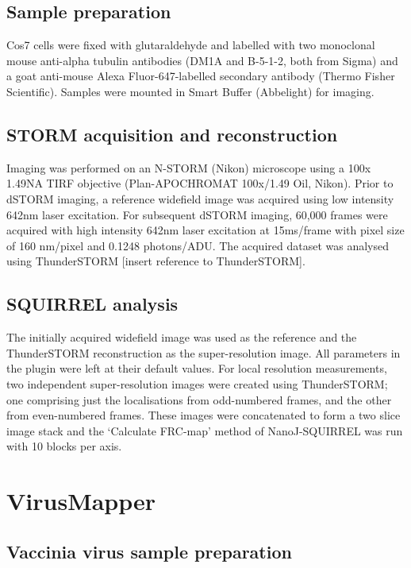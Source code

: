 \subsection{Sample preparation}

Cos7 cells were fixed with glutaraldehyde and labelled with two monoclonal mouse anti-alpha tubulin antibodies (DM1A and B-5-1-2, both from Sigma) and a goat anti-mouse Alexa Fluor-647-labelled secondary antibody (Thermo Fisher Scientific). Samples were mounted in Smart Buffer (Abbelight) for imaging.

\subsection{STORM acquisition and reconstruction}

Imaging was performed on an N-STORM (Nikon) microscope using a 100x 1.49NA TIRF objective (Plan-APOCHROMAT 100x/1.49 Oil, Nikon). Prior to dSTORM imaging, a reference widefield image was acquired using low intensity 642nm laser excitation. For subsequent dSTORM imaging, 60,000 frames were acquired with high intensity 642nm laser excitation at 15ms/frame with pixel size of 160 nm/pixel and 0.1248 photons/ADU. The acquired dataset was analysed using ThunderSTORM [insert reference to ThunderSTORM].

\subsection{SQUIRREL analysis}

The initially acquired widefield image was used as the reference and the ThunderSTORM reconstruction as the super-resolution image. All parameters in the plugin were left at their default values. For local resolution measurements, two independent super-resolution images were created using ThunderSTORM; one comprising just the localisations from odd-numbered frames, and the other from even-numbered frames. These images were concatenated to form a two slice image stack and the ‘Calculate FRC-map’ method of NanoJ-SQUIRREL was run with 10 blocks per axis.


\section{VirusMapper}

\subsection{Vaccinia virus sample preparation}
 
